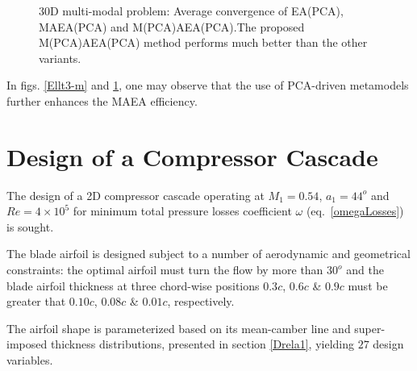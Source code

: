 \begin{figure}[h!]
\begin{minipage}[b]{1\linewidth}
 \centering
\end{minipage}
\caption{30D multi-modal problem: Average convergence of EA(PCA), MAEA(PCA) and M(PCA)AEA(PCA).The proposed M(PCA)AEA(PCA) method performs much better than the other variants.} 
\label{mmt3m}
\end{figure}

In figs. \ref{Ellt3-m} and \ref{mmt3m}, one may observe that the use of PCA-driven metamodels further enhances the MAEA efficiency.


\section{Design of a Compressor Cascade}


The design of a 2D compressor cascade operating at $M_1\!=\!0.54$, $a_1\!=\!44^o$ and $Re\!=\!4\times10^5$ for minimum total pressure losses coefficient $\omega$ (eq.\ \ref{omegaLosses}) is sought. 

The blade airfoil is designed subject to a number of aerodynamic and geometrical constraints: the optimal airfoil must turn the flow by more than $30^o$ and the blade airfoil thickness at three chord-wise positions $0.3c$, $0.6c$ \& $0.9c$ must be greater that $0.10c$, $0.08c$ \& $0.01c$,  respectively.     

The airfoil shape is parameterized based on its mean-camber line and super-imposed thickness distributions, presented in section \ref{Drela1}, yielding $27$ design variables.

